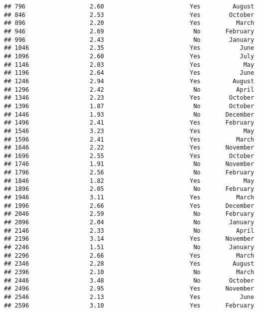 \documentclass[
]{article}
\begin{document}
\begin{verbatim}
## 796                  2.60                        Yes         August
## 846                  2.53                        Yes        October
## 896                  2.20                        Yes          March
## 946                  2.69                         No       February
## 996                  2.43                         No        January
## 1046                 2.35                        Yes           June
## 1096                 2.60                        Yes           July
## 1146                 2.03                        Yes            May
## 1196                 2.64                        Yes           June
## 1246                 2.94                        Yes         August
## 1296                 2.42                         No          April
## 1346                 2.23                        Yes        October
## 1396                 1.87                         No        October
## 1446                 1.93                         No       December
## 1496                 2.41                        Yes       February
## 1546                 3.23                        Yes            May
## 1596                 2.41                        Yes          March
## 1646                 2.22                        Yes       November
## 1696                 2.55                        Yes        October
## 1746                 1.91                         No       November
## 1796                 2.56                         No       February
## 1846                 1.82                        Yes            May
## 1896                 2.05                         No       February
## 1946                 3.11                        Yes          March
## 1996                 2.66                        Yes       December
## 2046                 2.59                         No       February
## 2096                 2.04                         No        January
## 2146                 2.33                         No          April
## 2196                 3.14                        Yes       November
## 2246                 1.51                         No        January
## 2296                 2.66                        Yes          March
## 2346                 2.28                        Yes         August
## 2396                 2.10                         No          March
## 2446                 3.48                         No        October
## 2496                 2.95                        Yes       November
## 2546                 2.13                        Yes           June
## 2596                 3.10                        Yes       February

\end{verbatim}
\end{document}
